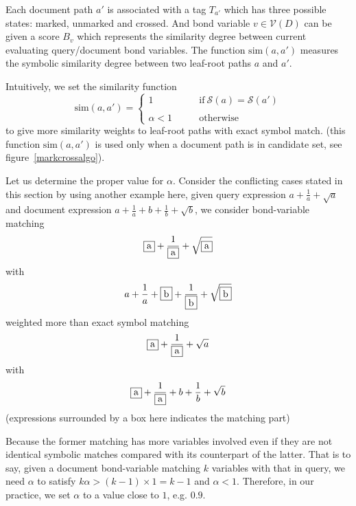 Each document path $a'$ is associated with a tag $T_{a'}$ which has three possible states: marked, unmarked and crossed. And bond variable $v \in \mathcal{V}(D)$ can be given a score $B_v$ which represents the similarity degree between current evaluating query/document bond variables. 
The function $\mathrm{sim}(a,a')$ measures the symbolic similarity degree between two leaf-root paths $a$ and $a'$. 

Intuitively, we set the similarity function
$$
\mathrm{sim}(a,a') = 
\left\{
\begin{array}{ll}
1    &\qquad \mathrm{if}\  \mathcal{S}(a) = \mathcal{S}(a')
\\
\\
\alpha < 1  &\qquad \mathrm{otherwise}
\end{array}
\right.
$$
to give more similarity weights to leaf-root paths with exact symbol match.
(this function $\mathrm{sim}(a,a')$ is used only when a document path is in candidate set, see figure~\ref{markcrossalgo}).

Let us determine the proper value for $\alpha$. 
Consider the conflicting cases stated in this section by using another example here, 
given query expression $a+\frac 1 a + \sqrt{a}$ and document expression $a+\frac 1 a + b + \frac 1 b + \sqrt{b}$, we consider bond-variable matching 
$$\fbox{a}+\dfrac 1 {\fbox{a}} + \sqrt{\fbox{a}}$$
with 
$$a+\dfrac 1 a + \fbox{b} + \dfrac 1 {\fbox{b}} + \sqrt{\fbox{b}}$$
weighted more than exact symbol matching 
$$\fbox{a}+\dfrac 1 {\fbox{a}} + \sqrt{a}$$ 
with 
$$\fbox{a}+\dfrac 1 {\fbox{a}} + b + \dfrac 1 b + \sqrt{b}$$
(expressions surrounded by a box here indicates the matching part)

Because the former matching has more variables involved even if they are not identical symbolic matches compared with its counterpart of the latter. 
That is to say, given a document bond-variable matching $k$ variables with that in query, we need $\alpha$ to satisfy $ k \alpha > (k-1) \times 1 = k - 1 $
and $\alpha < 1$. 
Therefore, in our practice, we set $\alpha$ to a value close to $1$, e.g. $0.9$.

